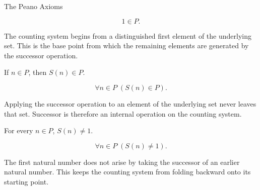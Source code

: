 \begin{topicbox}{The Peano Axioms}
\begin{remark*}
\[
1 \in P.
\]
\end{remark*}

\begin{remark*}[Interpretation]
The counting system begins from a distinguished first element of the
underlying set. This is the base point from which the remaining elements are
generated by the successor operation.
\end{remark*}

\NoLocalDependencies

\begin{tcolorbox}[colback=axiombox, colframe=axiomborder, arc=2pt,
  left=6pt, right=6pt, top=4pt, bottom=4pt,
  title={\small\textbf{Axiom (Closure Under Successor)}},
  fonttitle=\small\bfseries]
\begin{axiom}
\label{ax:peano-successor-closure}
If $n \in P$, then $S(n) \in P$.
\end{axiom}
\end{tcolorbox}

\begin{remark*}
\[
\forall n \in P\;(S(n) \in P).
\]
\end{remark*}

\begin{remark*}[Interpretation]
Applying the successor operation to an element of the underlying set never
leaves that set. Successor is therefore an internal operation on the counting
system.
\end{remark*}

\NoLocalDependencies

\begin{tcolorbox}[colback=axiombox, colframe=axiomborder, arc=2pt,
  left=6pt, right=6pt, top=4pt, bottom=4pt,
  title={\small\textbf{Axiom (One Is Not a Successor)}},
  fonttitle=\small\bfseries]
\begin{axiom}
\label{ax:peano-one-not-successor}
For every $n \in P$, $S(n) \neq 1$.
\end{axiom}
\end{tcolorbox}

\begin{remark*}
\[
\forall n \in P\;(S(n) \neq 1).
\]
\end{remark*}

\begin{remark*}[Interpretation]
The first natural number does not arise by taking the successor of an earlier
natural number. This keeps the counting system from folding backward onto its
starting point.
\end{remark*}


\end{topicbox}
